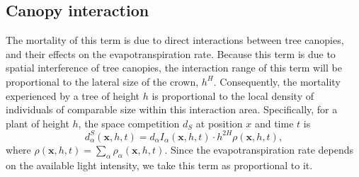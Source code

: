 \documentclass[aps,pre,twocolumn,superscriptaddress,10pt]{revtex4-2}
\begin{document}
\subsection*{Canopy interaction} The mortality of this term is due to direct interactions between tree canopies, and their effects on the evapotranspiration rate. Because this term is due to spatial interference of tree canopies, the interaction range of this term will be proportional to the lateral size of the crown, $h^H$. Consequently, the mortality experienced by a tree of height $h$ is proportional to the local density of individuals of comparable size within this interaction area. Specifically, for a plant of height $h$, the space competition $d_S$ at position $x$ and time $t$ is 
\begin{equation}
    d^{S}_{\alpha}(\mathbf{x},h,t) = d_\alpha I_\alpha(\mathbf{x}, h, t) \cdot h^{2H} \rho(\mathbf{x},h,t),
\end{equation}
where $\rho(\mathbf{x},h,t)=\sum_{\alpha}\rho_{\alpha}(\mathbf{x},h,t)$. Since the evapotranspiration rate depends on the available light intensity, we take this term as proportional to it.
\end{document}
